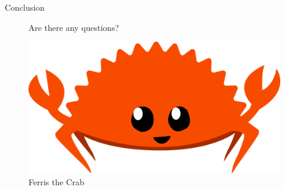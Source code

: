 \begin{frame}{Conclusion}
    \begin{figure}
        \huge
        \centerline{Are there any questions?}

        \br

        \includegraphics[width=0.4\linewidth]{images/ferris.png}
        \caption{Ferris the Crab \cite{ferris}}
    \end{figure}
\end{frame}
